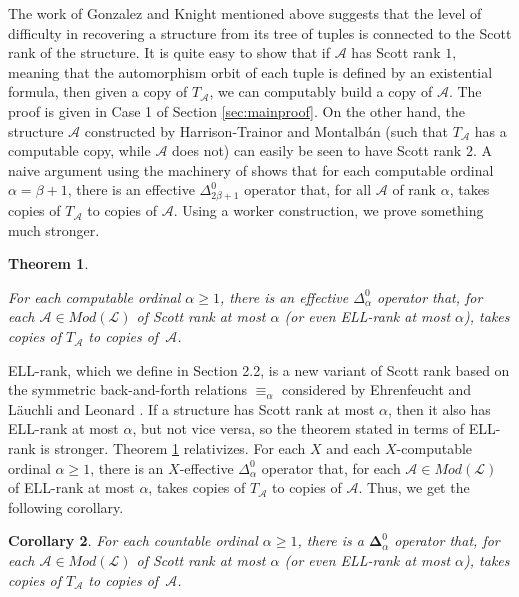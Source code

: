 \documentclass[10pt,a4paper]{article}
\newcommand{\ELL}{\textnormal{ELL}}
\newcommand{\bfDelta}{\boldsymbol{\Delta}}
\newtheorem{thm}{Theorem}[section]
\newtheorem{cor}[thm]{Corollary}
\theoremstyle{definition}
\begin{document}
	The work of Gonzalez and Knight \cite{GonzalezKnight} mentioned above suggests that the level of difficulty in recovering a structure from its tree of tuples is connected to the Scott rank of the structure. It is quite easy to show that if $\mathcal{A}$ has Scott rank $1$, meaning that the automorphism orbit of each tuple is defined by an existential formula, then given a copy of $T_\mathcal{A}$, we can computably build a copy of $\mathcal{A}$. The proof is given in Case 1 of Section \ref{sec:mainproof}. On the other hand, the structure $\mathcal{A}$ constructed by Harrison-Trainor and Montalb\'an (such that $T_\mathcal{A}$ has a computable copy, while $\mathcal{A}$ does not) can easily be seen to have Scott rank $2$. A naive argument using the machinery of \cite{GonzalezKnight} shows that for each computable ordinal $\alpha = \beta+1$, there is an effective $\Delta^0_{2\beta+1}$ operator that, for all $\mathcal{A}$ of rank $\alpha$, takes copies of $T_\mathcal{A}$ to copies of $\mathcal{A}$. Using a worker construction, we prove something much stronger.
	
	\begin{thm}	\label{Bounding}
		
		For each computable ordinal $\alpha\geq 1$, there is an effective $\Delta^0_\alpha$ operator that, for each $\mathcal{A}\in Mod(\mathcal{L})$ of Scott rank at most $\alpha$ (or even \ELL-rank at most $\alpha$), takes copies of $T_\mathcal{A}$ to copies of~$\mathcal{A}$.
	\end{thm}
	
	\ELL-rank, which we define in Section 2.2, is a new variant of Scott rank based on the symmetric back-and-forth relations $\equiv_\alpha$ considered by Ehrenfeucht \cite{Ehrenfeucht} and L\"{a}uchli and Leonard \cite{Lauchli}. If a structure has Scott rank at most $\alpha$, then it also has \ELL-rank at most $\alpha$, but not vice versa, so the theorem stated in terms of \ELL-rank is stronger. 
	Theorem \ref{Bounding} relativizes. For each $X$ and each $X$-computable ordinal $\alpha\geq 1$, there is an $X$-effective $\Delta^0_\alpha$ operator that, for each $\mathcal{A}\in Mod(\mathcal{L})$ of \ELL-rank at most $\alpha$, takes copies of $T_\mathcal{A}$ to copies of $\mathcal{A}$. Thus, we get the following corollary.
	
	\begin{cor}
		For each countable ordinal $\alpha\geq 1$, there is a $\bfDelta^0_\alpha$ operator that, for each $\mathcal{A}\in Mod(\mathcal{L})$ of Scott rank at most $\alpha$ (or even \ELL-rank at most $\alpha$), takes copies of $T_\mathcal{A}$ to copies of~$\mathcal{A}$.
	\end{cor}
	
\end{document}
